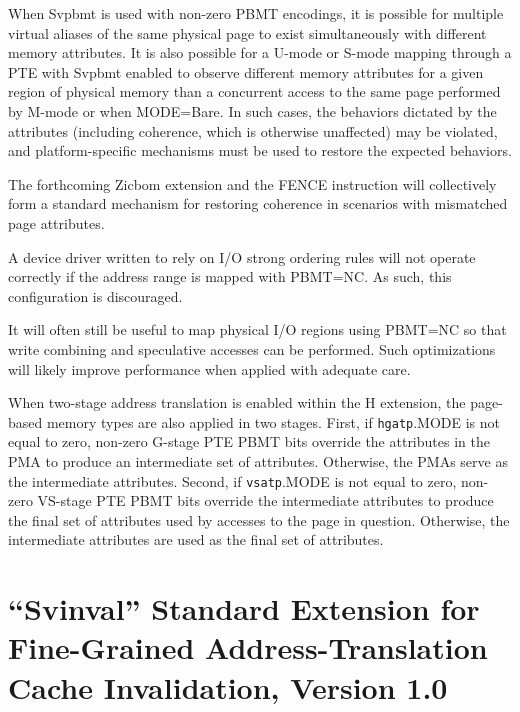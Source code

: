 When Svpbmt is used with non-zero PBMT encodings,
it is possible for multiple virtual aliases of the same
physical page to exist simultaneously with different memory attributes.  It is
also possible for a U-mode or S-mode mapping through a PTE with Svpbmt enabled
to observe different memory attributes for a given region of physical memory
than a concurrent access to the same page performed by M-mode or when
MODE=Bare.  In such cases, the behaviors dictated by the attributes (including
coherence, which is otherwise unaffected) may be violated, and
platform-specific mechanisms must be used to restore the expected behaviors.

\begin{commentary}
The forthcoming Zicbom extension and the FENCE instruction will collectively
form a standard mechanism for restoring coherence in scenarios with
mismatched page attributes.
\end{commentary}

\begin{commentary}
A device driver written to rely on I/O strong ordering rules will not
operate correctly if the address range is mapped with PBMT=NC.
As such, this configuration is discouraged.

It will often still be useful to map physical I/O regions using PBMT=NC so that
write combining and speculative accesses can be performed.  Such optimizations
will likely improve performance when applied with adequate care.
\end{commentary}

When two-stage address translation is enabled within the H extension, the
page-based memory types are also applied in two stages.  First, if
{\tt hgatp}.MODE is not equal to zero, non-zero G-stage PTE PBMT bits override
the attributes in the PMA to produce an intermediate set of attributes.
Otherwise, the PMAs serve as the intermediate attributes.  Second, if
{\tt vsatp}.MODE is not equal to zero, non-zero VS-stage PTE PBMT bits override
the intermediate attributes to produce the final set of attributes used by
accesses to the page in question.  Otherwise, the intermediate attributes are
used as the final set of attributes.

\chapter{``Svinval'' Standard Extension for Fine-Grained Address-Translation Cache Invalidation, Version 1.0}
\label{svinval}

